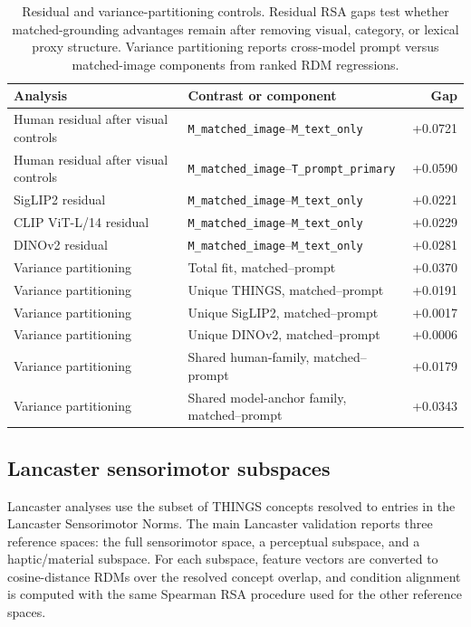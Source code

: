 \documentclass{article}
\begin{document}
\begin{table}[!htbp]
\centering
\caption{Residual and variance-partitioning controls. Residual RSA gaps test whether matched-grounding advantages remain after removing visual, category, or lexical proxy structure. Variance partitioning reports cross-model prompt versus matched-image components from ranked RDM regressions.}
\label{tab:appendix_residual_variance_controls}
\footnotesize
\begin{tabular}{llr}
\toprule
Analysis & Contrast or component & Gap \\
\midrule
Human residual after visual controls & \texttt{M\_matched\_image}--\texttt{M\_text\_only} & +0.0721 \\
Human residual after visual controls & \texttt{M\_matched\_image}--\texttt{T\_prompt\_primary} & +0.0590 \\
SigLIP2 residual & \texttt{M\_matched\_image}--\texttt{M\_text\_only} & +0.0221 \\
CLIP ViT-L/14 residual & \texttt{M\_matched\_image}--\texttt{M\_text\_only} & +0.0229 \\
DINOv2 residual & \texttt{M\_matched\_image}--\texttt{M\_text\_only} & +0.0281 \\
\midrule
Variance partitioning & Total fit, matched--prompt & +0.0370 \\
Variance partitioning & Unique THINGS, matched--prompt & +0.0191 \\
Variance partitioning & Unique SigLIP2, matched--prompt & +0.0017 \\
Variance partitioning & Unique DINOv2, matched--prompt & +0.0006 \\
Variance partitioning & Shared human-family, matched--prompt & +0.0179 \\
Variance partitioning & Shared model-anchor family, matched--prompt & +0.0343 \\
\bottomrule
\end{tabular}
\end{table}

\subsection{Lancaster sensorimotor subspaces}

Lancaster analyses use the subset of THINGS concepts resolved to entries in the Lancaster Sensorimotor Norms. The main Lancaster validation reports three reference spaces: the full sensorimotor space, a perceptual subspace, and a haptic/material subspace. For each subspace, feature vectors are converted to cosine-distance RDMs over the resolved concept overlap, and condition alignment is computed with the same Spearman RSA procedure used for the other reference spaces.
\end{document}
